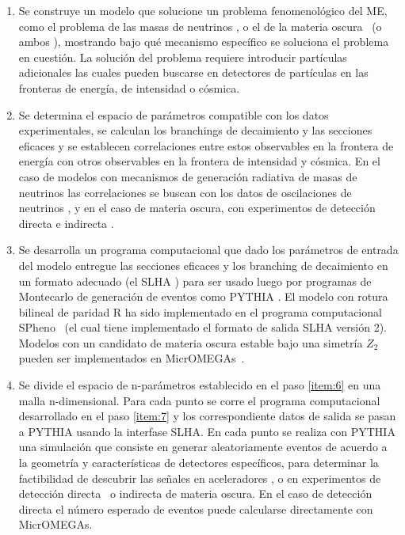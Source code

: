 \begin{enumerate}
\item Se construye un modelo que solucione un problema fenomenológico
  del ME, como el problema de las masas de neutrinos
  \cite{Hirsch:2000ef}, o el de la materia oscura~\cite{Bernal:2009tt,Bernal:2009jc} (o ambos
  \cite{Hirsch:2005ag,Restrepo:2011rj}), mostrando bajo qué mecanismo
  específico se soluciona el problema en cuestión. La solución del
  problema requiere introducir partículas adicionales las cuales
  pueden buscarse en detectores de partículas en las fronteras de
  energía, de intensidad o cósmica.
  \label{item:5}
\item Se determina el espacio de parámetros compatible con los datos
  experimentales, se calculan los branchings de decaimiento y las
  secciones eficaces y se establecen correlaciones entre estos
  observables en la frontera de energía con otros observables en la
  frontera de intensidad y cósmica. En el caso de modelos con
  mecanismos de generación radiativa de masas de neutrinos las
  correlaciones se buscan con los datos de oscilaciones de neutrinos
  \cite{Diaz:2003as}, y en el caso de materia oscura, con experimentos
  de detección directa e indirecta
  \cite{Bernal:2009tt,Bernal:2009jc,Choi:2010xn,Restrepo:2011rj}.
  \label{item:6}
\item Se desarrolla un programa computacional que dado los parámetros
  de entrada del modelo entregue las secciones eficaces y los
  branching de decaimiento en un formato adecuado (el SLHA
  \cite{Allanach:2008qq}) para ser usado luego por programas de Montecarlo
  de generación de eventos como PYTHIA \cite{Sjostrand:2006za}. El
  modelo con rotura bilineal de paridad R ha sido implementado en el
  programa computacional SPheno~\cite{Porod:2003um} (el cual tiene
  implementado el formato de salida SLHA versión 2). Modelos con un
  candidato de materia oscura estable bajo una simetría $Z_2$ pueden
  ser implementados en MicrOMEGAs~\cite{Belanger:2006is,Belanger:2008sj,Belanger:2010gh}.
  \label{item:7}
\item Se divide el espacio de n-parámetros establecido en el paso
  \ref{item:6} en una malla n-dimensional. Para cada punto se corre el
  programa computacional desarrollado en el paso \ref{item:7} y los
  correspondiente datos de salida se pasan a PYTHIA usando la
  interfase SLHA. En cada punto se realiza con PYTHIA una simulación
  que consiste en generar aleatoriamente eventos de acuerdo a la
  geometría y características de detectores específicos, para
  determinar la factibilidad de descubrir las señales en aceleradores
  \cite{Magro:2003zb,deCampos:2005ri,deCampos:2007bn,deCampos:2008ic,deCampos:2008re},
  o en experimentos de detección directa~\cite{Bernal:2009tt,Bernal:2009jc} o indirecta \cite{Choi:2010xn} de
  materia oscura. En el caso de detección directa el número esperado
  de eventos puede calcularse directamente con MicrOMEGAs. 


\end{enumerate}
